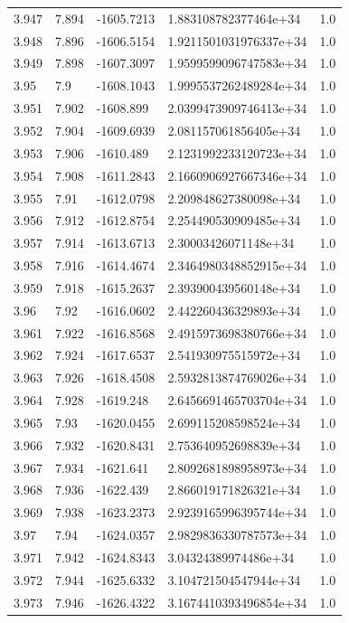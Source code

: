 \begin{tabular}{lllll}
3.947 & 7.894 & -1605.7213 & 1.883108782377464e+34 & 1.0 \\
3.948 & 7.896 & -1606.5154 & 1.9211501031976337e+34 & 1.0 \\
3.949 & 7.898 & -1607.3097 & 1.9599599096747583e+34 & 1.0 \\
3.95 & 7.9 & -1608.1043 & 1.9995537262489284e+34 & 1.0 \\
3.951 & 7.902 & -1608.899 & 2.0399473909746413e+34 & 1.0 \\
3.952 & 7.904 & -1609.6939 & 2.081157061856405e+34 & 1.0 \\
3.953 & 7.906 & -1610.489 & 2.1231992233120723e+34 & 1.0 \\
3.954 & 7.908 & -1611.2843 & 2.1660906927667346e+34 & 1.0 \\
3.955 & 7.91 & -1612.0798 & 2.209848627380098e+34 & 1.0 \\
3.956 & 7.912 & -1612.8754 & 2.254490530909485e+34 & 1.0 \\
3.957 & 7.914 & -1613.6713 & 2.30003426071148e+34 & 1.0 \\
3.958 & 7.916 & -1614.4674 & 2.3464980348852915e+34 & 1.0 \\
3.959 & 7.918 & -1615.2637 & 2.393900439560148e+34 & 1.0 \\
3.96 & 7.92 & -1616.0602 & 2.442260436329893e+34 & 1.0 \\
3.961 & 7.922 & -1616.8568 & 2.4915973698380766e+34 & 1.0 \\
3.962 & 7.924 & -1617.6537 & 2.541930975515972e+34 & 1.0 \\
3.963 & 7.926 & -1618.4508 & 2.5932813874769026e+34 & 1.0 \\
3.964 & 7.928 & -1619.248 & 2.6456691465703704e+34 & 1.0 \\
3.965 & 7.93 & -1620.0455 & 2.699115208598524e+34 & 1.0 \\
3.966 & 7.932 & -1620.8431 & 2.753640952698839e+34 & 1.0 \\
3.967 & 7.934 & -1621.641 & 2.8092681898958973e+34 & 1.0 \\
3.968 & 7.936 & -1622.439 & 2.866019171826321e+34 & 1.0 \\
3.969 & 7.938 & -1623.2373 & 2.9239165996395744e+34 & 1.0 \\
3.97 & 7.94 & -1624.0357 & 2.9829836330787573e+34 & 1.0 \\
3.971 & 7.942 & -1624.8343 & 3.04324389974486e+34 & 1.0 \\
3.972 & 7.944 & -1625.6332 & 3.104721504547944e+34 & 1.0 \\
3.973 & 7.946 & -1626.4322 & 3.1674410393496854e+34 & 1.0 \\

\end{tabular}
